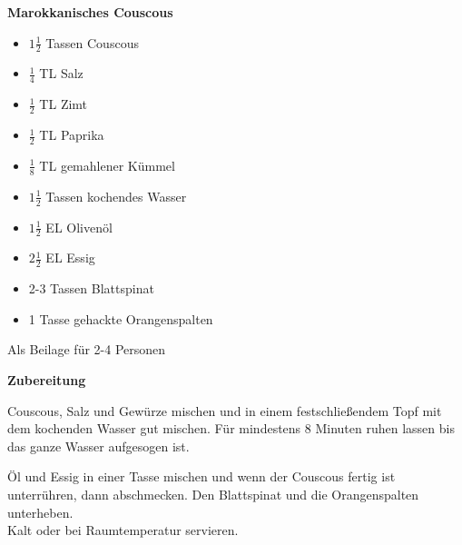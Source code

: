 


\parindent0pt	

\pagestyle{empty}


\textbf{{\LARGE Marokkanisches Couscous}}%


\hrulefill
\vspace*{\fill}
\begin{multicols}{2}	


\begin{itemize}
\item  $1\frac{1}{2}$ Tassen Couscous
\item  $\frac{1}{4}$ TL Salz
\item  $\frac{1}{2}$ TL  Zimt
\item $\frac{1}{2}$ TL Paprika
\item  $\frac{1}{8}$ TL gemahlener Kümmel
\item  $1\frac{1}{2}$ Tassen kochendes Wasser
\item $1\frac{1}{2}$ EL Olivenöl
\item $2\frac{1}{2}$ EL Essig
\item 2-3 Tassen Blattspinat
\item 1 Tasse gehackte Orangenspalten
\end{itemize}
\vfill									
\end{multicols}

\vspace{2cm}			%
\begin{center}			%
Als Beilage für 2-4 Personen
\end{center}


\vfill
\newpage
\textbf{{\LARGE Zubereitung}}%

\hrulefill

\vspace*{\fill}
\begin{multicols}{2}

Couscous, Salz und Gewürze mischen und in einem festschließendem Topf mit dem kochenden Wasser
gut mischen. Für mindestens 8 Minuten ruhen lassen bis das ganze Wasser aufgesogen ist.

Öl und Essig in einer Tasse mischen und wenn der Couscous fertig ist unterrühren, dann abschmecken.
Den Blattspinat und die Orangenspalten unterheben.\\

Kalt oder bei Raumtemperatur servieren.

\end{multicols}
\vfill
